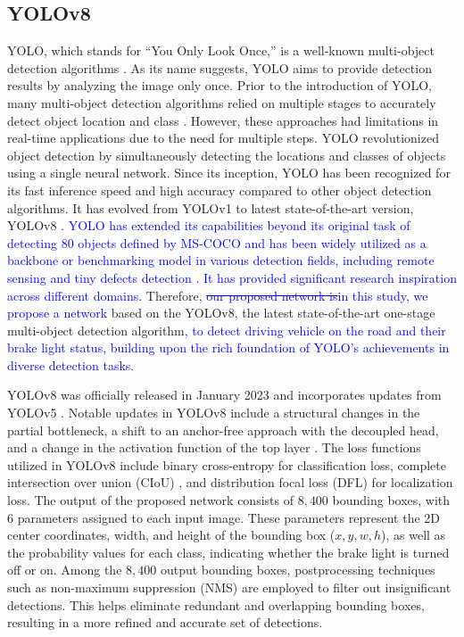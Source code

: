 \subsection{YOLOv8}
YOLO, which stands for ``You Only Look Once,'' is a well-known multi-object detection algorithms \cite{redmon2016you}.
As its name suggests, YOLO aims to provide detection results by analyzing the image only once. 
Prior to the introduction of YOLO, many multi-object detection algorithms relied on multiple stages to accurately detect object location and class \cite{girshick2014rich, he2015spatial, girshick2015fast, ren2015faster}.
However, these approaches had limitations in real-time applications due to the need for multiple steps.
YOLO revolutionized object detection by simultaneously detecting the locations and classes of objects using a single neural network.
Since its inception, YOLO has been recognized for its fast inference speed and high accuracy compared to other object detection algorithms.
It has evolved from YOLOv1 to latest state-of-the-art version, YOLOv8 \cite{redmon2016you, redmon2017yolo9000, redmon2018yolov3, bochkovskiy2020yolov4, YOLOv5, li2022yolov6, wang2023yolov7, YOLOv8}.
\textcolor{blue}{
YOLO has extended its capabilities beyond its original task of detecting $80$ objects defined by MS-COCO \cite{lin2014microsoft} and has been widely utilized as a backbone or benchmarking model in various detection fields, including remote sensing \cite{ye2022adaptive} and tiny defects detection \cite{zeng2022small}.
It has provided significant research inspiration across different domains.
}
Therefore, \textcolor{blue}{ \sout{our proposed network is}in this study, we propose a network} based on the YOLOv8, the latest state-of-the-art one-stage multi-object detection algorithm\textcolor{blue}{, to detect driving vehicle on the road and their brake light status, building upon the rich foundation of YOLO's achievements in diverse detection tasks}.

YOLOv8 \cite{YOLOv8} was officially released in January 2023 and incorporates updates from YOLOv5 \cite{YOLOv5}.
Notable updates in YOLOv8 include a structural changes in the partial bottleneck, a shift to an anchor-free approach with the decoupled head, and a change in the activation function of the top layer \cite{terven2023comprehensive}.
The loss functions utilized in YOLOv8 include binary cross-entropy for classification loss, complete intersection over union (CIoU) \cite{zheng2020distance}, and distribution focal loss (DFL) \cite{li2020generalized} for localization loss.
The output of the proposed network consists of $8,400$ bounding boxes, with $6$ parameters assigned to each input image.
These parameters represent the 2D center coordinates, width, and height of the bounding box ($x, y, w, h$), as well as the probability values for each class, indicating whether the brake light is turned off or on. 
Among the $8,400$ output bounding boxes, postprocessing techniques such as non-maximum suppression (NMS) are employed to filter out insignificant detections.
This helps eliminate redundant and overlapping bounding boxes, resulting in a more refined and accurate set of detections.

